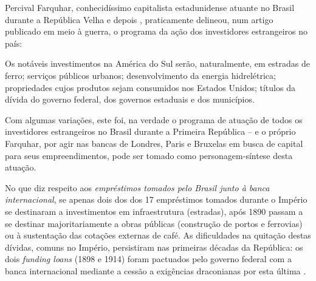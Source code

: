 Percival Farquhar, conhecidíssimo capitalista estadunidense atuante no Brasil durante a República Velha e depois \cite[pp~28, 35-41, 53-54, 60-61, 76, 83-84, 121, 150-152]{CUNHA2011}, praticamente delineou, num artigo publicado em meio à guerra, o programa da ação dos investidores estrangeiros no país:

\begin{citacao}
Os notáveis investimentos na América do Sul serão, naturalmente, em estradas de ferro; serviços públicos urbanos; desenvolvimento da energia hidrelétrica; propriedades cujos produtos sejam consumidos nos Estados Unidos; títulos da dívida do governo federal, dos governos estaduais e dos municípios. \cite[p.~398]{farquhar_invest_1916}
\end{citacao}

Com algumas variações, este foi, na verdade o programa de atuação de todos os investidores estrangeiros no Brasil durante a Primeira República -- e o próprio Farquhar, por agir nas bancas de Londres, Paris e Bruxelas em busca de capital para seus empreendimentos, pode ser tomado como personagem-síntese desta atuação.

No que diz respeito aos \textit{empréstimos tomados pelo Brasil junto à banca internacional}, se apenas dois dos dos 17 empréstimos tomados durante o Império se destinaram a investimentos em infraestrutura (estradas), após 1890 passam a se destinar majoritariamente a obras públicas (construção de portos e ferrovias) ou à sustentação das cotações externas de café. As dificuldades na quitação destas dívidas, comuns no Império, persistiram nas primeiras décadas da República: os dois \textit{funding loans} (1898 e 1914) foram pactuados pelo governo federal com a banca internacional mediante a cessão a exigências draconianas por esta última \cite[p.~365]{singer_braecomu_1977}.

